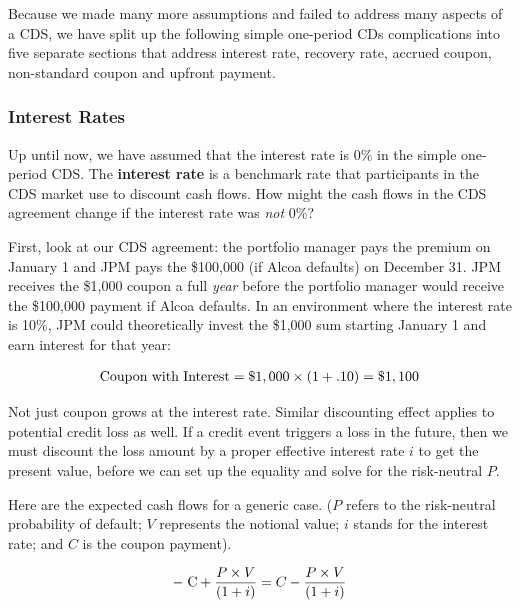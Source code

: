 \documentclass{jss}
\begin{document}
Because we made many more assumptions and failed to address many aspects of a CDS, we have split up the following simple one-period CDs complications into five separate sections that address interest rate, recovery rate, accrued coupon, non-standard coupon and upfront payment. 

\subsubsection{Interest Rates}
\label{sec:InterestRate}

Up until now, we have assumed that the interest rate is 0\% in the simple one-period CDS. The \textbf{interest rate} is a benchmark rate that participants in the CDS market use to discount cash flows. How might the cash flows in the CDS agreement change if the interest rate was \emph{not} 0\%?

First, look at our CDS agreement: the portfolio manager pays the premium on January 1 and JPM pays the \$100,000 (if Alcoa defaults) on December 31. JPM receives the \$1,000 coupon a full \emph{year} before the portfolio manager would receive the \$100,000 payment if Alcoa defaults. In an environment where the interest rate is 10\%, JPM could theoretically invest the \$1,000 sum starting January 1 and earn interest for that year:

\begin{equation}
 \begin{aligned}
  {\rm Coupon\hspace{3pt}with\hspace{3pt}Interest = {\$1,000}\times{(1 + .10)} = \$1,100} 
    \end{aligned}
\end{equation}

Not just coupon grows at the interest rate. Similar discounting effect applies to potential credit loss as well. If a credit event triggers a loss in the future, then we must discount the loss amount by a proper effective interest rate $i$ to get the present value, before we can set up the equality and solve for the risk-neutral $P$.

Here are the expected cash flows for a generic case. ($P$ refers to the risk-neutral probability of default; $V$ represents the notional value; $i$ stands for the interest rate; and $C$ is the coupon payment).

\begin{equation}
 \begin{aligned}
  {\rm -\hspace{3pt}C} + \frac{P \times V}{(1 + i)} = C - \frac{P \times V}{(1 + i)} 
    \end{aligned}
\label{eqn:InterestRate}
\end{equation}
\end{document}

